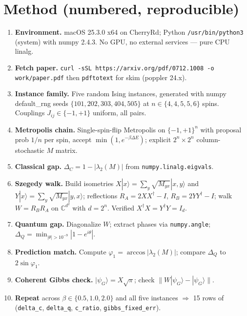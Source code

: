 \documentclass[11pt]{article}
\begin{document}
\section{Method (numbered, reproducible)}
\begin{enumerate}
  \item \textbf{Environment.} macOS 25.3.0 x64 on CherryRd; Python
        \texttt{/usr/bin/python3} (system) with numpy 2.4.3. No GPU, no
        external services --- pure CPU linalg.
  \item \textbf{Fetch paper.} \verb|curl -sSL https://arxiv.org/pdf/0712.1008 -o work/paper.pdf|
        then \verb|pdftotext| for skim (poppler 24.x).
  \item \textbf{Instance family.} Five random Ising instances, generated
        with numpy default\_rng seeds $\{101, 202, 303, 404, 505\}$ at
        $n \in \{4, 4, 5, 5, 6\}$ spins. Couplings $J_{ij} \in \{-1, +1\}$
        uniform, all pairs.
  \item \textbf{Metropolis chain.} Single-spin-flip Metropolis on
        $\{-1, +1\}^n$ with proposal prob $1/n$ per spin, accept
        $\min(1, e^{-\beta\Delta E})$; explicit $2^n \times 2^n$
        column-stochastic $M$ matrix.
  \item \textbf{Classical gap.} $\Delta_C = 1 - |\lambda_2(M)|$ from
        \verb|numpy.linalg.eigvals|.
  \item \textbf{Szegedy walk.} Build isometries
        $X|x\rangle = \sum_y \sqrt{M_{yx}} |x, y\rangle$ and
        $Y|x\rangle = \sum_y \sqrt{M_{yx}} |y, x\rangle$; reflections
        $R_A = 2 X X^\dagger - I$, $R_B = 2 Y Y^\dagger - I$; walk
        $W = R_B R_A$ on $\mathbb{C}^{d^2}$ with $d = 2^n$. Verified
        $X^\dagger X = Y^\dagger Y = I_d$.
  \item \textbf{Quantum gap.} Diagonalize $W$; extract phases via
        \verb|numpy.angle|; $\Delta_Q = \min_{|\theta| > 10^{-9}} |1 - e^{i\theta}|$.
  \item \textbf{Prediction match.} Compute $\varphi_1 = \arccos|\lambda_2(M)|$;
        compare $\Delta_Q$ to $2\sin\varphi_1$.
  \item \textbf{Coherent Gibbs check.} $|\psi_G\rangle = X\sqrt{\pi}$;
        check $\|W|\psi_G\rangle - |\psi_G\rangle\|$.
  \item \textbf{Repeat} across $\beta \in \{0.5, 1.0, 2.0\}$ and all five
        instances $\Rightarrow$ 15 rows of (\texttt{delta\_c},
        \texttt{delta\_q}, \texttt{c\_ratio}, \texttt{gibbs\_fixed\_err}).
\end{enumerate}
\end{document}
